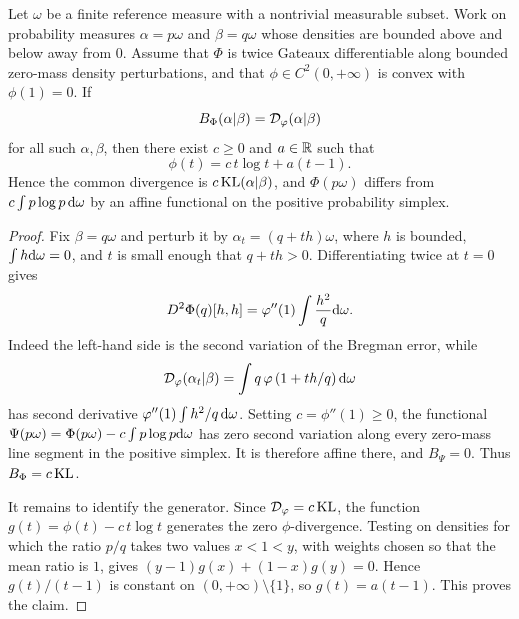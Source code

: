 \begin{prop}\label{prop-kl-only-bregman-phi}
	Let $\omega$ be a finite reference measure with a nontrivial measurable subset. Work on probability measures $\alpha=p\omega$ and $\beta=q\omega$ whose densities are bounded above and below away from $0$. Assume that $\Phi$ is twice Gateaux differentiable along bounded zero-mass density perturbations, and that $\phi\in C^2(0,+\infty)$ is convex with $\phi(1)=0$. If
	\[
		B_\Phi(\alpha|\beta)=\mathcal{D}_\varphi(\alpha|\beta)
	\]
	for all such $\alpha,\beta$, then there exist $c\geq0$ and $a\in\mathbb{R}$ such that
	\[
		\phi(t)=c\,t\log t+a(t-1).
	\]
	Hence the common divergence is $c\operatorname{KL}(\alpha|\beta)$, and $\Phi(p\omega)$ differs from $c\int p\log p\,\mathrm{d}\omega$ by an affine functional on the positive probability simplex.
\end{prop}

\begin{proof}
	Fix $\beta=q\omega$ and perturb it by $\alpha_t=(q+t h)\omega$, where $h$ is bounded, $\int h\mathrm{d}\omega=0$, and $t$ is small enough that $q+t h>0$. Differentiating twice at $t=0$ gives
	\[
		D^2\Phi(q)[h,h]
		=
		\varphi''(1)\int \frac{h^2}{q}\mathrm{d}\omega .
	\]
	Indeed the left-hand side is the second variation of the Bregman error, while
	\[
		\mathcal{D}_\varphi(\alpha_t|\beta)
		=
		\int q\,\varphi\left(1+t h/q\right)\mathrm{d}\omega
	\]
	has second derivative $\varphi''(1)\int h^2/q\,\mathrm{d}\omega$. Setting $c=\phi''(1)\geq0$, the functional $\Psi(p\omega)=\Phi(p\omega)-c\int p\log p\mathrm{d}\omega$ has zero second variation along every zero-mass line segment in the positive simplex. It is therefore affine there, and $B_\Psi=0$. Thus $B_\Phi=c\operatorname{KL}$.

	It remains to identify the generator. Since $\mathcal{D}_\varphi=c\operatorname{KL}$, the function $g(t)=\phi(t)-c\,t\log t$ generates the zero $\phi$-divergence. Testing on densities for which the ratio $p/q$ takes two values $x<1<y$, with weights chosen so that the mean ratio is $1$, gives $(y-1)g(x)+(1-x)g(y)=0$. Hence $g(t)/(t-1)$ is constant on $(0,+\infty)\setminus\{1\}$, so $g(t)=a(t-1)$. This proves the claim.
\end{proof}

